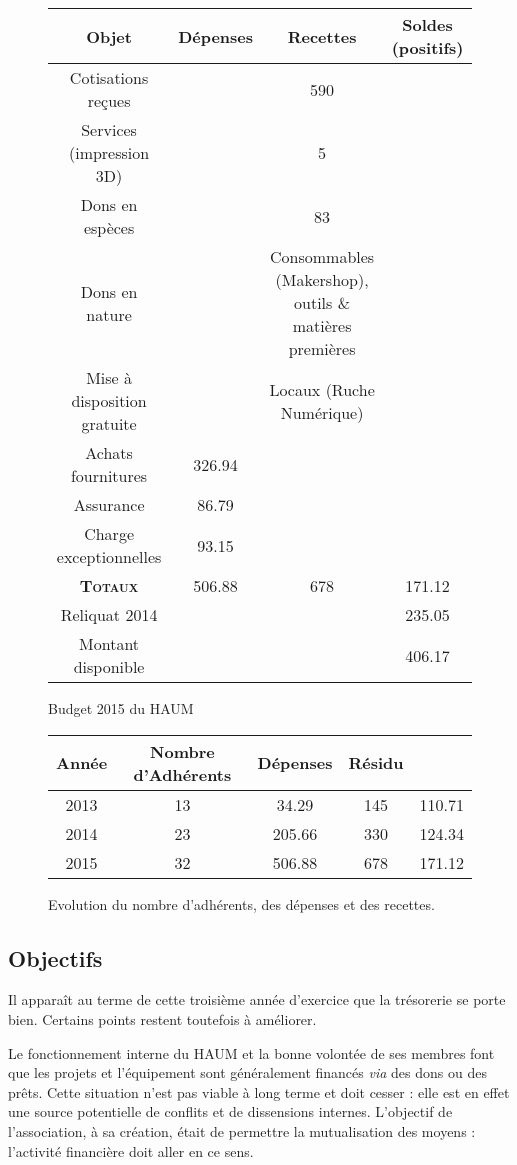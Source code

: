 \documentclass[11pt]{article}
\begin{document}
\begin{figure}[!ht]\centering
	\begin{tabular}{c|ccc}
		Objet & Dépenses & Recettes & Soldes (positifs)\\\hline
		Cotisations reçues & & 590 & \\
		Services (impression 3D) & & 5 & \\
		Dons en espèces & & 83 & \\
		Dons en nature & & \parbox[c]{5cm}{Consommables (Makershop),\\outils \& matières premières}  & \\
		Mise à disposition gratuite & & Locaux (Ruche Numérique) & \\\hline\hline
		Achats fournitures & 326.94 & & \\
		Assurance & 86.79 & & \\
		Charge exceptionnelles & 93.15 & & \\\hline\hline
		\textsc{\textbf{Totaux}} & 506.88 & 678 & 171.12\\\hline
		Reliquat 2014 & & & 235.05\\
		Montant disponible & & & 406.17
	\end{tabular}
	\caption{Budget 2015 du HAUM}
\end{figure}

\begin{figure}[!ht]\centering
\begin{tabular}{c|c|cc|c}
	Année & Nombre d'Adhérents & Dépenses & Résidu\\\hline
	2013 & 13 & 34.29 & 145 & 110.71\\
	2014 & 23 & 205.66 & 330 & 124.34\\
	2015 & 32 & 506.88 & 678 & 171.12
\end{tabular}
\caption{Evolution du nombre d'adhérents, des dépenses et des recettes.}
\end{figure}

\subsection{Objectifs}

Il apparaît au terme de cette troisième année d'exercice que la trésorerie se porte bien. Certains points restent
toutefois à améliorer.

Le fonctionnement interne du HAUM et la bonne volontée de ses membres font que les projets et l'équipement sont
généralement financés \textit{via} des dons ou des prêts. Cette situation n'est pas viable à long terme et doit cesser :
elle est en effet une source potentielle de conflits et de dissensions internes. L'objectif de l'association, à sa
création, était de permettre la mutualisation des moyens : l'activité financière doit aller en ce sens.
\end{document}
